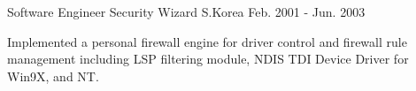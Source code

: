 \begin{cventries}
  \cventry
    {Software Engineer} %
    {Security Wizard} %
    {S.Korea} %
    {Feb. 2001 - Jun. 2003} %
    {
      \begin{cvitems} %
        \item {Implemented a personal firewall engine for driver control and firewall rule management including LSP filtering module, NDIS TDI Device Driver for Win9X, and NT.}
      \end{cvitems}
    }

\end{cventries}
